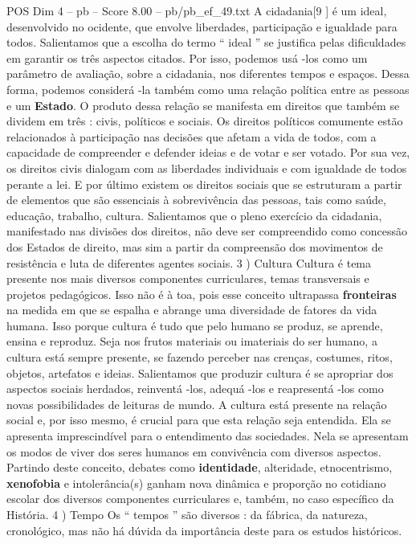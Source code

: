 \begin{textsample}{POS Dim 4 – pb – Score 8.00 – pb/pb\_ef\_49.txt}
A cidadania[9 ] é um ideal, desenvolvido no ocidente, que envolve liberdades, participação e igualdade para todos.
Salientamos que a escolha do termo “ ideal ” se justifica pelas dificuldades em garantir os três aspectos citados.
Por isso, podemos usá -los como um parâmetro de avaliação, sobre a cidadania, nos diferentes tempos e espaços.
Dessa forma, podemos considerá -la também como uma relação política entre as pessoas e um \textbf{Estado}.
O produto dessa relação se manifesta em direitos que também se dividem em três : civis, políticos e sociais.
Os direitos políticos comumente estão relacionados à participação nas decisões que afetam a vida de todos, com a capacidade de compreender e defender ideias e de votar e ser votado.
Por sua vez, os direitos civis dialogam com as liberdades individuais e com igualdade de todos perante a lei.
E por último existem os direitos sociais que se estruturam a partir de elementos que são essenciais à sobrevivência das pessoas, tais como saúde, educação, trabalho, cultura.
Salientamos que o pleno exercício da cidadania, manifestado nas divisões dos direitos, não deve ser compreendido como concessão dos Estados de direito, mas sim a partir da compreensão dos movimentos de resistência e luta de diferentes agentes sociais. 3 ) Cultura Cultura é tema presente nos mais diversos componentes curriculares, temas transversais e projetos pedagógicos.
Isso não é à toa, pois esse conceito ultrapassa \textbf{fronteiras} na medida em que se espalha e abrange uma diversidade de fatores da vida humana.
Isso porque cultura é tudo que pelo humano se produz, se aprende, ensina e reproduz.
Seja nos frutos materiais ou imateriais do ser humano, a cultura está sempre presente, se fazendo perceber nas crenças, costumes, ritos, objetos, artefatos e ideias.
Salientamos que produzir cultura é se apropriar dos aspectos sociais herdados, reinventá -los, adequá -los e reapresentá -los como novas possibilidades de leituras de mundo.
A cultura está presente na relação social e, por isso mesmo, é crucial para que esta relação seja entendida.
Ela se apresenta imprescindível para o entendimento das sociedades.
Nela se apresentam os modos de viver dos seres humanos em convivência com diversos aspectos.
Partindo deste conceito, debates como \textbf{identidade}, alteridade, etnocentrismo, \textbf{xenofobia} e intolerância(s) ganham nova dinâmica e proporção no cotidiano escolar dos diversos componentes curriculares e, também, no caso específico da História. 4 ) Tempo Os “ tempos ” são diversos : da fábrica, da natureza, cronológico, mas não há dúvida da importância deste para os estudos históricos.

\end{textsample}
